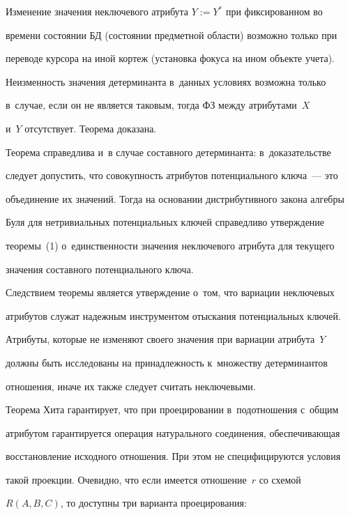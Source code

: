 Изменение значения неключевого атрибута $Y := Y^*$ при фиксированном во 

времени состоянии БД (состоянии предметной области) возможно только при 

переводе курсора на иной кортеж (установка фокуса на ином объекте учета). 

Неизменность значения детерминанта в~данных условиях возможна только 

в~случае, если он не является таковым, тогда ФЗ между атрибутами~$X$ 

и~$Y$ отсутствует. Теорема доказана.

  

  \smallskip

  

  Теорема справедлива и~в случае составного детерминанта: в~доказательстве 

следует допустить, что совокупность атрибутов потенциального ключа~--- это 

объединение их значений. Тогда на основании дистрибутивного закона ал\-геб\-ры 

Буля для нетривиальных потенциальных ключей справедливо утверж\-де\-ние 

теоремы~(1) о~един\-ст\-вен\-ности значения неключевого атрибута для текущего 

значения со\-став\-но\-го потенциального ключа.

  

  Следствием теоремы является утверждение о~том, что вариации неключевых 

атрибутов служат надежным инструментом отыскания потенциальных ключей. 

Атрибуты, которые не изменяют своего значения при вариации атрибута~$Y$ 

должны быть исследованы на принадлежность к~множеству детерминантов 

отношения, иначе их также следует считать неключевыми.

  

  Теорема Хита гарантирует, что при проецировании в~подотношения с~общим 

атрибутом гарантируется операция натурального соединения, обеспечивающая 

восстановление исходного отношения. При этом не специфицируются условия 

такой проекции. Очевидно, что если имеется отношение~$r$ со схемой 

$R(A,B,C)$, то доступны три варианта проецирования:

